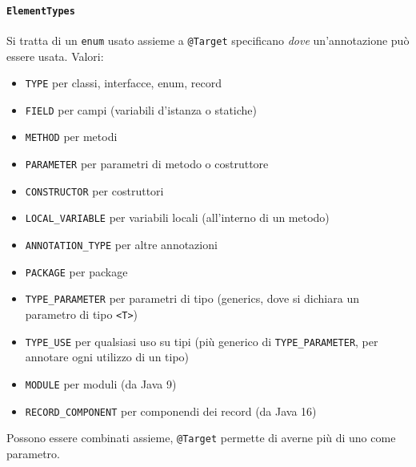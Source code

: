 \paragraph{\texttt{ElementTypes}} Si tratta di un \texttt{enum} usato assieme a \texttt{@Target} specificano \textit{dove} un'annotazione può essere usata. Valori:
\begin{itemize}
    \item \texttt{TYPE} per classi, interfacce, enum, record

    \item \texttt{FIELD} per campi (variabili d'istanza o statiche)

    \item \texttt{METHOD} per metodi

    \item \texttt{PARAMETER} per parametri di metodo o costruttore

    \item \texttt{CONSTRUCTOR} per costruttori

    \item \texttt{LOCAL\_VARIABLE} per variabili locali (all'interno di un metodo)

    \item \texttt{ANNOTATION\_TYPE}  per altre annotazioni

    \item \texttt{PACKAGE} per package

    \item \texttt{TYPE\_PARAMETER} per parametri di tipo (generics, dove si dichiara un parametro di tipo \texttt{<T>})

    \item \texttt{TYPE\_USE} per qualsiasi uso su tipi (più generico di \texttt{TYPE\_PARAMETER}, per annotare ogni utilizzo di un tipo)

    \item \texttt{MODULE} per moduli (da Java 9)

    \item \texttt{RECORD\_COMPONENT} per componendi dei record (da Java 16)
\end{itemize}
Possono essere combinati assieme, \texttt{@Target} permette di averne più di uno come parametro.

